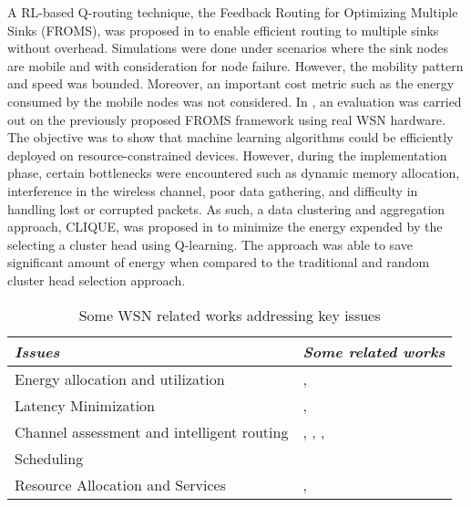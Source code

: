 \documentclass[journal]{IEEEtran}
\begin{document}
A RL-based Q-routing technique, the Feedback Routing for Optimizing Multiple Sinks (FROMS), was proposed in \cite{Forster2007, Forster2007FROMS} to enable efficient routing to multiple sinks without overhead. Simulations were done under scenarios where the sink nodes are mobile and with consideration for node failure. However, the mobility pattern and speed was bounded. Moreover, an important cost metric such as the energy consumed by the mobile nodes was not considered. In \cite{Forster2008}, an evaluation was carried out on the previously proposed FROMS framework using real WSN hardware. The objective was to show that machine learning algorithms could be efficiently deployed on resource-constrained devices. However, during the implementation phase, certain bottlenecks were encountered such as dynamic memory allocation, interference in the wireless channel, poor data gathering, and difficulty in handling lost or corrupted packets. As such, a data clustering and aggregation approach, CLIQUE, was proposed in \cite{Forster2009} to minimize the energy expended by the selecting a cluster head using Q-learning. The approach was able to save significant amount of energy when compared to the traditional and random cluster head selection approach.





\begin{table}
\small
\centering
\caption{Some WSN related works addressing key issues}
\label{table:refissuesWSN}
\begin{tabular}{ll}
  \hline
 \textit{Issues} & \textit{Some related works} \\
  \hline \hline
   Energy allocation and utilization &  \cite{Chen2008}, \cite{Chen2011} \\
   Latency Minimization &  \cite{Liang2009}, \cite{Chen2009}    \\
   Channel assessment and intelligent routing  &  \cite{Forster2007}, \cite{Forster2007FROMS}, \cite{Forster2008}, \cite{Forster2009}\\
   Scheduling &  \cite{Mihaylov}    \\
   Resource Allocation and Services & \cite{Shah2007}, \cite{Shah2013}\\

      \hline \hline
 \end{tabular}
 \end{table}
\end{document}
